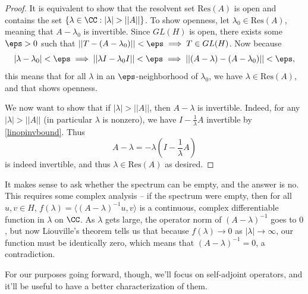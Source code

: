 \begin{proof}
It is equivalent to show that the resolvent set $\text{Res}(A)$ is open and contains the set $\{\lambda \in \CC: |\lambda| > ||A||\}$. To show openness, let $\lambda_0 \in \text{Res}(A)$, meaning that $A - \lambda_0$ is invertible. Since $GL(H)$ is open, there exists some $\eps > 0$ such that $||T - (A - \lambda_0) || < \eps \implies T \in GL(H)$. Now because 
\[
    |\lambda - \lambda_0| < \eps \implies ||\lambda I - \lambda_0 I|| < \eps \implies ||(A - \lambda) - (A - \lambda_0)|| < \eps, 
\]
this means that for all $\lambda$ in an $\eps$-neighborhood of $\lambda_0$, we have $\lambda \in \text{Res}(A)$, and that shows openness. 

We now want to show that if $|\lambda| > ||A||$, then $A - \lambda$ is invertible. Indeed, for any $|\lambda| > ||A||$ (in particular $\lambda$ is nonzero), we have
$I - \frac{1}{\lambda} A$ invertible by \cref{linopinvbound}. Thus
\[
    A - \lambda = -\lambda\left(I - \frac{1}{\lambda} A\right)
\]
is indeed invertible, and thus $\lambda \in \text{Res}(A)$ as desired. 
\end{proof}

\begin{remark}
It makes sense to ask whether the spectrum can be empty, and the answer is no. This requires some complex analysis -- if the spectrum were empty, then for all $u, v \in H$, $f(\lambda) = \langle (A - \lambda)^{-1}u, v \rangle$ is a continuous, complex differentiable function in $\lambda$ on $\CC$. As $\lambda$ gets large, the operator norm of $(A - \lambda)^{-1}$ goes to $0$, but now Liouville's theorem tells us that because $f(\lambda) \to 0$ as $|\lambda| \to \infty$, our function must be identically zero, which means that $(A - \lambda)^{-1} = 0$, a contradiction.
\end{remark}

For our purposes going forward, though, we'll focus on self-adjoint operators, and it'll be useful to have a better characterization of them. 

